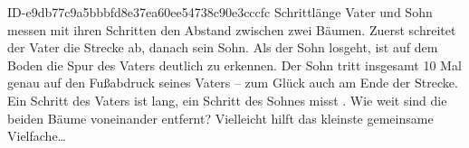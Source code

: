 \begin{exercise}
      {ID-e9db77c9a5bbbfd8e37ea60ee54738c90e3cccfc}
      {Schrittlänge}
  \ifproblem\problem
    Vater und Sohn messen mit ihren Schritten den Abstand zwischen zwei Bäumen.
    Zuerst schreitet der Vater die Strecke ab, danach sein Sohn. Als der Sohn
    losgeht, ist auf dem Boden die Spur des Vaters deutlich zu erkennen.
    Der Sohn tritt insgesamt 10 Mal genau auf den Fußabdruck seines Vaters --
    zum Glück auch am Ende der Strecke. Ein Schritt des Vaters ist 
    lang, ein Schritt des Sohnes misst . Wie weit sind die beiden
    Bäume voneinander entfernt?
  \fi
  \ifoutline\outline
    Vielleicht hilft das kleinste gemeinsame Vielfache\ldots
  \fi
\end{exercise}
